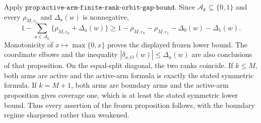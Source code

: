 Apply \(\texttt{prop:active-arm-finite-rank-orbit-gap-bound}\). Since \(\mathcal A_{\boldsymbol\varepsilon}\subseteq\{0,1\}\) and every \(\rho_{M,\varepsilon_a}\) and \(\Delta_a(w)\) is nonnegative,
\[
1-\sum_{a\in\mathcal A_{\boldsymbol\varepsilon}}\{\rho_{M,\varepsilon_a}+\Delta_a(w)\}
\ge
1-\rho_{M,\varepsilon_0}-\rho_{M,\varepsilon_1}-\Delta_0(w)-\Delta_1(w).
\]
Monotonicity of \(x\mapsto\max\{0,x\}\) proves the displayed frozen lower bound. The coordinate elbows and the inequality \(|\delta_{a,O}(w)|\le\Delta_a(w)\) are also conclusions of that proposition. On the equal-split diagonal, the two ranks coincide. If \(k\le M\), both arms are active and the active-arm formula is exactly the stated symmetric formula. If \(k=M+1\), both arms are boundary arms and the active-arm proposition gives coverage one, which is at least the stated symmetric lower bound. Thus every assertion of the frozen proposition follows, with the boundary regime sharpened rather than weakened.